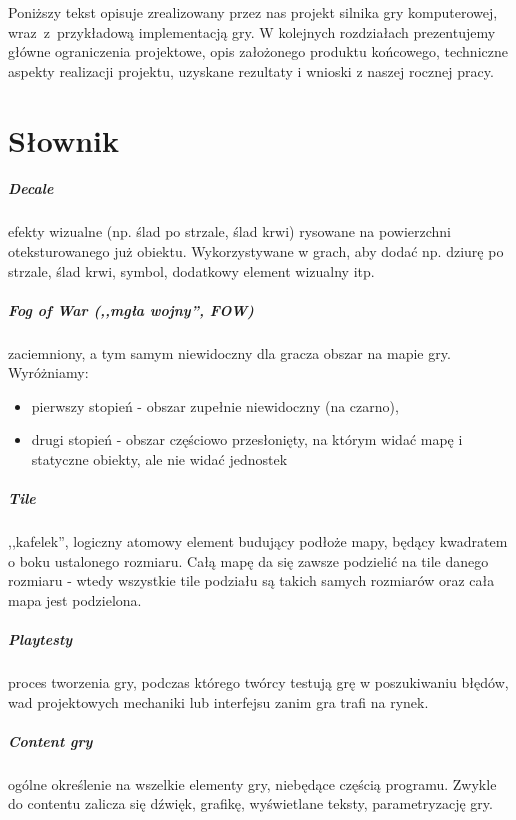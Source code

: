 \documentclass[licencjacka]{pracamgr}
\begin{document}
Poniższy tekst opisuje zrealizowany przez nas projekt silnika gry komputerowej, wraz~z~przykładową implementacją gry. W kolejnych
rozdziałach prezentujemy główne ograniczenia projektowe, opis założonego produktu końcowego,
techniczne aspekty realizacji projektu, uzyskane rezultaty i wnioski z naszej rocznej pracy.


\chapter{Słownik}
  \paragraph{Decale} efekty wizualne (np. ślad po strzale, ślad krwi) rysowane na powierzchni oteksturowanego już obiektu.
  Wykorzystywane w grach, aby dodać np. dziurę po strzale, ślad krwi, symbol, dodatkowy element wizualny itp.

  \paragraph{Fog of War (,,mgła wojny'', FOW)} zaciemniony, a tym samym niewidoczny dla gracza obszar na mapie gry. Wyróżniamy:
  \begin{itemize}
   \item pierwszy stopień - obszar zupełnie niewidoczny (na czarno),
   \item drugi stopień - obszar częściowo przesłonięty, na którym widać mapę i statyczne obiekty, ale
      nie widać jednostek
  \end{itemize}

  \paragraph{Tile} ,,kafelek'', logiczny atomowy element budujący podłoże mapy, będący kwadratem o boku ustalonego rozmiaru. Całą
  mapę da się zawsze podzielić na tile danego rozmiaru - wtedy wszystkie tile podziału są takich samych rozmiarów oraz
  cała mapa jest podzielona.

  \paragraph{Playtesty} proces tworzenia gry, podczas którego twórcy testują grę w poszukiwaniu błędów,
  wad projektowych mechaniki lub interfejsu zanim gra trafi na rynek.
  \paragraph{Content gry} ogólne określenie na wszelkie elementy gry, niebędące częścią programu. Zwykle do contentu zalicza się
  dźwięk, grafikę, wyświetlane teksty, parametryzację gry.
\end{document}
